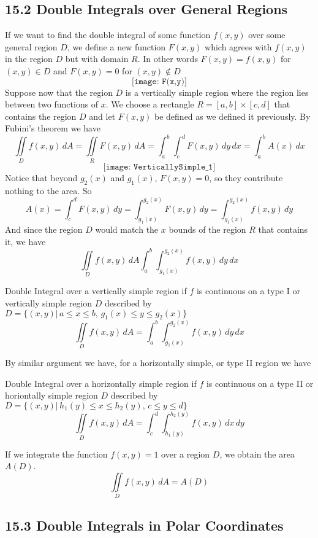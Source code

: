 \documentclass{article}
\begin{document}
	\subsection{15.2 Double Integrals over General Regions}
	If we want to find the double integral of some function $f(x,y)$ over some
	general region $D$, we define a new function $F(x,y)$ which agrees with $f(x,y)$
	in the region $D$ but with domain $R$. In other words $F(x,y)= f(x,y)$ for
	$(x,y) \in D$ and $F(x,y)= 0$ for $(x,y)\not\in D$
	\[
		\texttt{[image: F(x,y)]}
	\]
	Suppose now that the region $D$ is a vertically simple region where the region
	lies between two functions of $x$. We choose a rectangle $R=[a,b] \times [c,d]$
	that contains the region $D$ and let $F(x,y)$ be defined as we defined it previously.
	By Fubini's theorem we have
	\[
		\iint\limits_{D} f(x,y) \,dA = \iint\limits_{R} F(x,y) \,dA = \int_{a}^{b}\int
		_{c}^{d}F(x,y) \, dy \, dx =\int_{a}^{b}A(x) \, dx
	\]
	\[
		\texttt{[image: VerticallySimple\_1]}
	\]
	Notice that beyond $g_{2}(x)$ and $g_{1}(x)$, $F(x,y) = 0$, so they contribute
	nothing to the area. So
	\[
		A(x) = \int_{c}^{d}F(x,y) \, dy = \int_{g_1(x)}^{g_2(x)}F(x,y) \, dy = \int_{g_1(x)}
		^{g_2(x)}f(x,y) \, dy
	\]
	And since the region $D$ would match the $x$ bounds of the region $R$ that contains
	it, we have
	\[
		\iint\limits_{D} f(x,y) \,dA \int_{a}^{b}\int_{g_1(x)}^{g_2(x)}f(x,y) \, dy \,
		dx
	\]
	\begin{mybox}
		{Double Integral over a vertically simple region} if $f$ is continuous on a type
		I or vertically simple region $D$ described by $D = \{(x,y)|\, a \leq x \leq
		b, \, g_{1}(x) \leq y \leq g_{2}(x) \}$
		\[
			\iint\limits_{D} f(x,y) \,dA = \int_{a}^{b}\int_{g_1(x)}^{g_2(x)}f(x,y) \,
			dy \, dx
		\]
	\end{mybox}
	By similar argument we have, for a horizontally simple, or type II region we
	have
	\begin{mybox}
		{Double Integral over a horizontally simple region} if $f$ is continuous on a
		type II or horiontally simple region $D$ described by $D = \{(x,y)|\, h_{1}(y
		) \leq x \leq h_{2}(y), \, c \leq y \leq d \}$
		\[
			\iint\limits_{D} f(x,y) \,dA = \int_{c}^{d}\int_{h_1(y)}^{h_2(y)}f(x,y) \,
			dx \, dy
		\]
	\end{mybox}
	If we integrate the function $f(x,y) = 1$ over a region $D$, we obtain the area
	$A(D)$.
	\[
		\iint\limits_{D} f(x,y) \,dA = A(D)
	\]
	\subsection{15.3 Double Integrals in Polar Coordinates}
\end{document}

